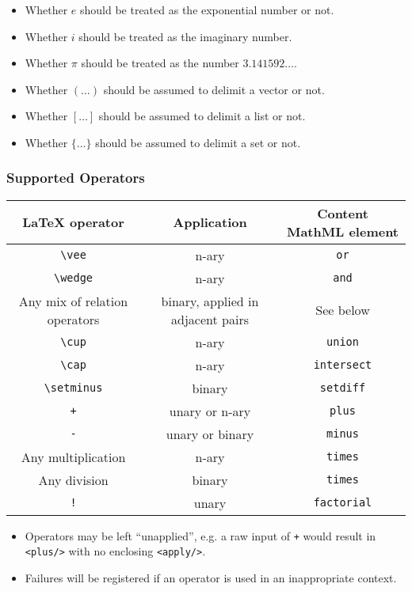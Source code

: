 \begin{itemize}
\item Whether $e$ should be treated as the exponential number or not.
\item Whether $i$ should be treated as the imaginary number.
\item Whether $\pi$ should be treated as the number $3.141592\ldots$.
\item Whether $(\ldots)$ should be assumed to delimit a vector or not.
\item Whether $[\ldots]$ should be assumed to delimit a list or not.
\item Whether $\{\ldots\}$ should be assumed to delimit a set or not.
\end{itemize}

\subsubsection*{Supported Operators}

\begin{tabular}{|c|c|c|}
\hline
LaTeX operator & Application & Content MathML element \\
\hline
\verb|\vee| & n-ary & \verb|or| \\
\verb|\wedge| & n-ary & \verb|and| \\
Any mix of relation operators & binary, applied in adjacent pairs & See below \\
\verb|\cup| & n-ary & \verb|union| \\
\verb|\cap| & n-ary & \verb|intersect| \\
\verb|\setminus| & binary & \verb|setdiff| \\
\verb|+| & unary or n-ary & \verb|plus| \\
\verb|-| & unary or binary & \verb|minus| \\
Any multiplication & n-ary & \verb|times| \\
Any division & binary & \verb|times| \\
\verb|!| & unary & \verb|factorial| \\
\hline
\end{tabular}

\begin{itemize}
\item
Operators may be left ``unapplied'', e.g. a raw input of \verb|+|
would result in \verb|<plus/>| with no enclosing
\verb|<apply/>|.

\item
Failures will be registered if an operator is used in an inappropriate
context.
\end{itemize}

